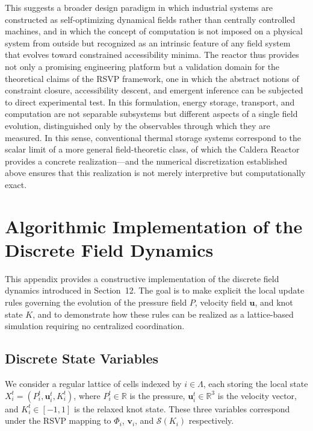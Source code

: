\documentclass[12pt, a4paper]{article}
\begin{document}
This suggests a broader design paradigm in which industrial systems are constructed as self-optimizing dynamical fields rather than centrally controlled machines, and in which the concept of computation is not imposed on a physical system from outside but recognized as an intrinsic feature of any field system that evolves toward constrained accessibility minima. The reactor thus provides not only a promising engineering platform but a validation domain for the theoretical claims of the RSVP framework, one in which the abstract notions of constraint closure, accessibility descent, and emergent inference can be subjected to direct experimental test. In this formulation, energy storage, transport, and computation are not separable subsystems but different aspects of a single field evolution, distinguished only by the observables through which they are measured. In this sense, conventional thermal storage systems correspond to the scalar limit of a more general field-theoretic class, of which the Caldera Reactor provides a concrete realization---and the numerical discretization established above ensures that this realization is not merely interpretive but computationally exact.


\appendix

\section{Algorithmic Implementation of the Discrete Field Dynamics}

This appendix provides a constructive implementation of the discrete field dynamics introduced in Section~12. The goal is to make explicit the local update rules governing the evolution of the pressure field $P$, velocity field $\mathbf{u}$, and knot state $K$, and to demonstrate how these rules can be realized as a lattice-based simulation requiring no centralized coordination.

\subsection{Discrete State Variables}

We consider a regular lattice of cells indexed by $i \in \Lambda$, each storing the local state $X_i^t = (P_i^t, \mathbf{u}_i^t, K_i^t)$, where $P_i^t \in \mathbb{R}$ is the pressure, $\mathbf{u}_i^t \in \mathbb{R}^3$ is the velocity vector, and $K_i^t \in [-1,1]$ is the relaxed knot state. These three variables correspond under the RSVP mapping to $\Phi_i$, $\mathbf{v}_i$, and $\mathcal{S}(K_i)$ respectively.
\end{document}
